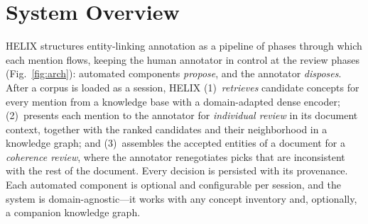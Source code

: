 \documentclass[runningheads]{llncs}
\begin{document}
\begin{table}[t]
\caption{Feature comparison of HELIX with representative EL annotation tools.
\checkmark~= supported, $\circ$~= partial/plugin, --~= none. Columns: knowledge-base
\emph{link}ing, \emph{dense} retrieval, knowledge-graph \emph{neighborhood} view,
\emph{document}-level coherence review, \emph{auto}-suggestion, \emph{provenance}
logging. Entries refer to \emph{native or documented} workflows, not functionality
achievable through custom extension --- several of these tools are scriptable enough
to approximate a missing column. ELEVANT~\cite{elevant} and AnNER~\cite{anner} are
omitted: they target error analysis and review rather than the interactive linking
loop compared here.}
\label{tab:tools}
\centering
\setlength{\tabcolsep}{5pt}
\footnotesize
{}
\end{table}

\section{System Overview}
\label{sec:system}

HELIX structures entity-linking annotation as a pipeline of phases through which
each mention flows, keeping the human annotator in control at the review phases
(Fig.~\ref{fig:arch}): automated components \emph{propose}, and the annotator
\emph{disposes}. After a corpus is loaded as a session, HELIX
(1)~\emph{retrieves} candidate concepts for every mention from a knowledge base with
a domain-adapted dense encoder; (2)~presents each mention to the annotator for
\emph{individual review} in its document context, together with the ranked
candidates and their neighborhood in a knowledge graph; and (3)~assembles the
accepted entities of a document for a \emph{coherence review}, where the annotator
renegotiates picks that are inconsistent with the
rest of the document. Every decision is persisted with its provenance. Each
automated component is optional and configurable per session, and the system is
domain-agnostic---it works with any concept inventory and, optionally, a companion
knowledge graph.
\end{document}

